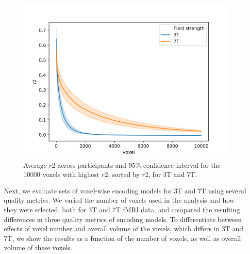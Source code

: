 \begin{figure}
  \centering
  \includegraphics[width=\linewidth]{pics/r2_plot.pdf}
	
  \caption{Average $r2$ across participants and 95\% confidence interval for the 10000 voxels with
    highest $r2$, sorted by $r2$, for 3T and 7T.
  }

 \label{fig:r2_plot}\end{figure}

Next, we evaluate sets of voxel-wise encoding models for 3T and 7T using several
quality metrics.
We varied the number of voxels used in the analysis and how they were selected,
both for 3T and 7T f{MRI} data, and compared the resulting differences in
three quality metrics of encoding models.
To differentiate between effects of voxel number and overall volume of the voxels,
which differs in 3T and 7T, we show the results as a function of the number of voxels,
as well as overall volume of these voxels.

